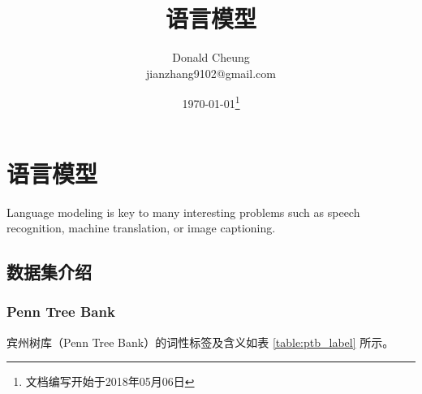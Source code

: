 \ifx\projectsnotes\undefined
    \providecommand{\notesroot}{../..}
    \providecommand{\lmroot}{.}

    \title{语言模型}
    \author{Donald Cheung\\jianzhang9102@gmail.com}
    \date{\today\footnote{文档编写开始于2018年05月06日}}

    
\else
    \providecommand{\lmroot}{\projectsroot/language_model}
\fi

\chapter{语言模型}
Language modeling is key to many interesting problems such as speech recognition, machine translation, or image captioning.

\section{数据集介绍}

\subsection{Penn Tree Bank}
宾州树库（Penn Tree Bank）的词性标签及含义如表 \ref{table:ptb_label} 所示。

